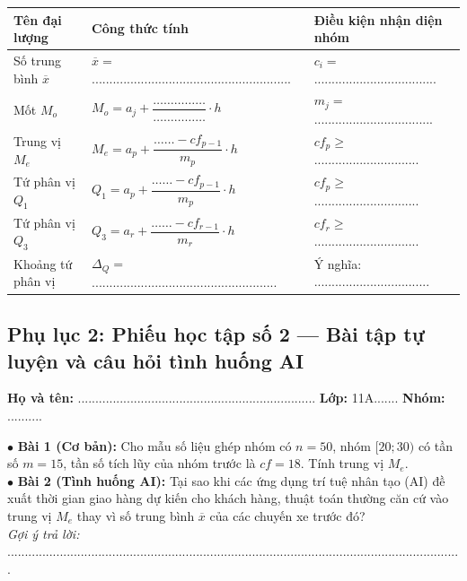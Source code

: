 \documentclass[12pt, a4paper]{article}
\begin{document}
\begin{pedabox}
\begin{center}
\begin{tabularx}{0.95\linewidth}{|l|X|l|}
\hline
\textbf{Tên đại lượng} & \textbf{Công thức tính} & \textbf{Điều kiện nhận diện nhóm} \\
\hline
Số trung bình $\overline{x}$ & $\overline{x} = $ ......................................................... & $c_i = $ ................................... \\
\hline
Mốt $M_o$ & $M_o = a_j + \dfrac{\dots\dots\dots\dots\dots}{\dots\dots\dots\dots\dots} \cdot h$ & $m_j = $ .................................. \\
\hline
Trung vị $M_e$ & $M_e = a_p + \dfrac{\dots\dots - cf_{p-1}}{m_p} \cdot h$ & $cf_p \ge $ .............................. \\
\hline
Tứ phân vị $Q_1$ & $Q_1 = a_p + \dfrac{\dots\dots - cf_{p-1}}{m_p} \cdot h$ & $cf_p \ge $ .............................. \\
\hline
Tứ phân vị $Q_3$ & $Q_3 = a_r + \dfrac{\dots\dots - cf_{r-1}}{m_r} \cdot h$ & $cf_r \ge $ .............................. \\
\hline
Khoảng tứ phân vị & $\Delta_Q = $ ..................................................... & Ý nghĩa: ................................. \\
\hline
\end{tabularx}
\end{center}
\end{pedabox}

\subsection*{Phụ lục 2: Phiếu học tập số 2 --- Bài tập tự luyện và câu hỏi tình huống AI}
\noindent\textbf{Họ và tên:} .................................................................... \textbf{Lớp:} 11A....... \textbf{Nhóm:} ..........

\begin{pedabox}
$\bullet$ \textbf{Bài 1 (Cơ bản):} Cho mẫu số liệu ghép nhóm có $n = 50$, nhóm $[20; 30)$ có tần số $m = 15$, tần số tích lũy của nhóm trước là $cf = 18$. Tính trung vị $M_e$.\\
$\bullet$ \textbf{Bài 2 (Tình huống AI):} Tại sao khi các ứng dụng trí tuệ nhân tạo (AI) đề xuất thời gian giao hàng dự kiến cho khách hàng, thuật toán thường căn cứ vào trung vị $M_e$ thay vì số trung bình $\overline{x}$ của các chuyến xe trước đó?\\
\textit{Gợi ý trả lời:} ..................................................................................................................................
\end{pedabox}
\end{document}
